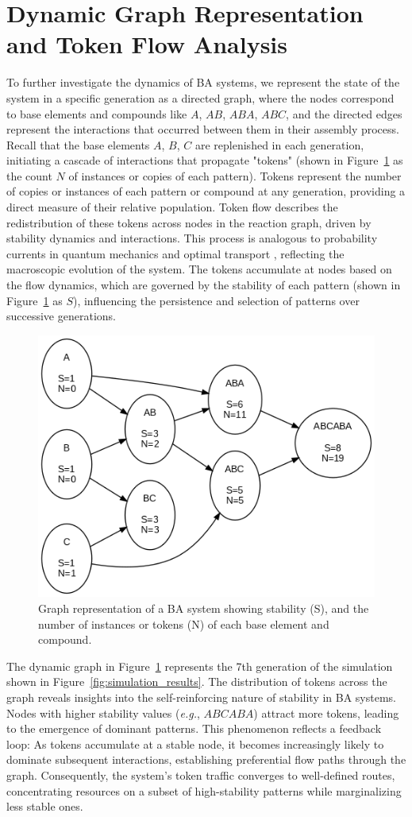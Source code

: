 \documentclass[entropy,article,submit,pdftex,moreauthors]{Definitions/mdpi}
\begin{document}
\section{Dynamic Graph Representation and Token Flow Analysis}

To further investigate the dynamics of BA systems, we represent the state of the system in a specific generation as a directed graph, where the nodes correspond to base elements and compounds like $A$, $AB$, $ABA$, $ABC$, and the directed edges represent the interactions that occurred between them in their assembly process. Recall that the base elements $A$, $B$, $C$ are replenished in each generation, initiating a cascade of interactions that propagate "tokens" (shown in Figure~\ref{fig:abc_sim} as the count $N$ of instances or copies of each pattern). Tokens represent the number of copies or instances of each pattern or compound at any generation, providing a direct measure of their relative population. Token flow describes the redistribution of these tokens across nodes in the reaction graph, driven by stability dynamics and interactions. This process is analogous to probability currents in quantum mechanics \cite{feynman1965quantum} and optimal transport \cite{villani2008optimal}, reflecting the macroscopic evolution of the system. The tokens accumulate at nodes based on the flow dynamics, which are governed by the stability of each pattern (shown in Figure~\ref{fig:abc_sim} as $S$), influencing the persistence and selection of patterns over successive generations.


\begin{figure}[h]
    \centering
    \includegraphics[width=0.5\linewidth]{abc_graph.png}
    \caption{Graph representation of a BA system showing stability (S), and the number of instances or tokens (N) of each base element and compound.}
    \label{fig:abc_sim}
\end{figure}

The dynamic graph in Figure~\ref{fig:abc_sim} represents the 7th generation of the simulation shown in Figure~\ref{fig:simulation_results}. The distribution of tokens across the graph reveals insights into the self-reinforcing nature of stability in BA systems. Nodes with higher stability values (\textit{e.g.}, $ABCABA$) attract more tokens, leading to the emergence of dominant patterns. This phenomenon reflects a feedback loop: As tokens accumulate at a stable node, it becomes increasingly likely to dominate subsequent interactions, establishing preferential flow paths through the graph. Consequently, the system's token traffic converges to well-defined routes, concentrating resources on a subset of high-stability patterns while marginalizing less stable ones.
\end{document}
